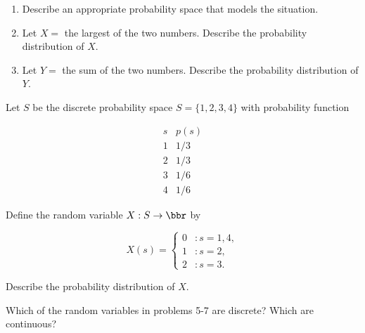 \documentclass[12pt,reqno]{amsart}
\begin{document}
\medskip
\begin{enumerate}
    \item Describe an appropriate probability space that models the situation.\vfill
    
    

    \item Let $X = $ the largest of the two numbers. Describe the probability distribution of $X$.\vfill
    
    

    \item Let $Y = $ the sum of the two numbers. Describe the probability distribution of $Y$.\vfill
    
    
\end{enumerate}















\bigskip
\prob Let $S$ be the discrete probability space $S = \{1,2,3,4\}$ with probability function

    \[
    \begin{array}{c|c}
    s & p(s) \\ \hline
    1 & 1/3\\
    2 & 1/3\\
    3 & 1/6\\
    4 & 1/6
    \end{array}
    \]

Define the random variable $X:S\to \bbr$ by

    \[X(s) = \begin{cases}
    0 & : s = 1, 4, \\
    1 & : s=2, \\
    2 & : s=3.
    \end{cases}\]

Describe the probability distribution of $X$.\vfill












\newpage
\prob Which of the random variables in problems 5-7 are discrete? Which are continuous?\vfill
\end{document}
